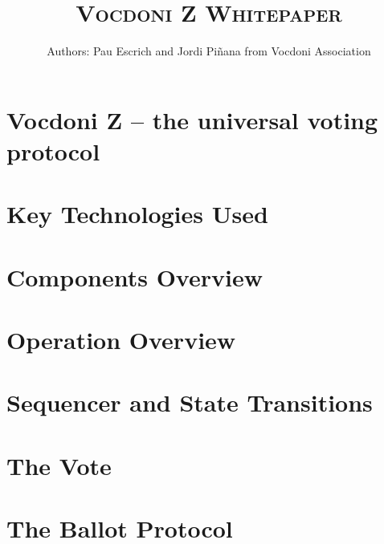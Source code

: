 \documentclass{llncs}
\title{\textsc{Vocdoni Z Whitepaper}\vspace{-0.4cm}}
\author{Authors: Pau Escrich and Jordi Piñana from Vocdoni Association}
\institute{Last update: \today}
\begin{document}
	
\maketitle

\pagestyle{plain}
\thispagestyle{plain}

\begin{abstract}
\end{abstract}

\setcounter{tocdepth}{3}
\makeatletter
\renewcommand*\l@author[2]{}
\renewcommand*\l@title[2]{}
\makeatletter
\tableofcontents

\section{Vocdoni Z -- the universal voting protocol}
\label{sec:vocdoni-z}


\section{Key Technologies Used}
\label{sec:tech-used}


\section{Components Overview}
\label{sec:components-overview}


\section{Operation Overview}
\label{sec:operation-overview}


\section{Sequencer and State Transitions}
\label{sec:sequencer-state-transition}


\section{The Vote}
\label{sec:vote}


\section{The Ballot Protocol}
\label{sec:ballot-protocol}

\end{document}
